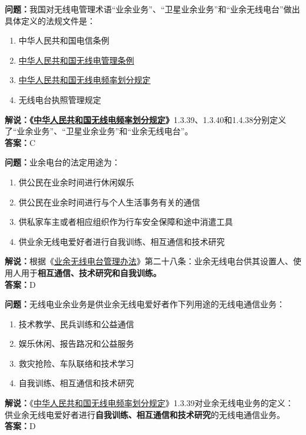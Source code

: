 \textbf{问题：}我国对无线电管理术语“业余业务”、“卫星业余业务”和“业余无线电台”做出具体定义的法规文件是：
\begin{enumerate}[label=\Alph*), leftmargin=1cm]
	\item 中华人民共和国电信条例
	\item \href{http://www.gov.cn/zhengce/content/2016-11/25/content_5137687.htm}{中华人民共和国无线电管理条例}
	\item \href{https://www.miit.gov.cn/zwgk/zcwj/wjfb/txy/art/2020/art_066386284cd2449493586c81ccafed11.html}{中华人民共和国无线电频率划分规定}
	\item 无线电台执照管理规定
\end{enumerate}
\textbf{解说：《\href{https://www.miit.gov.cn/zwgk/zcwj/wjfb/txy/art/2020/art_066386284cd2449493586c81ccafed11.html}{中华人民共和国无线电频率划分规定}》}1.3.39、1.3.40和1.4.38分别定义了“业余业务”、“卫星业余业务”和“业余无线电台”。\\\textbf{答案：}C


\textbf{问题：}业余电台的法定用途为：
\begin{enumerate}[label=\Alph*), leftmargin=1cm]
	\item 供公民在业余时间进行休闲娱乐
	\item 供公民在业余时间进行与个人生活事务有关的通信
	\item 供私家车主或者相应组织作为行车安全保障和途中消遣工具
	\item 供业余无线电爱好者进行自我训练、相互通信和技术研究
\end{enumerate}
\textbf{解说：}根据《\href{https://www.miit.gov.cn/jgsj/zfs/bmgz/art/2020/art_147b69815b3641caad9047735f94c860.html}{业余无线电台管理办法}》第二十八条：业余无线电台供其设置人、使用人用于\textbf{相互通信、技术研究和自我训练。}\\\textbf{答案：}D


\textbf{问题：}无线电业余业务是供业余无线电爱好者作下列用途的无线电通信业务：
\begin{enumerate}[label=\Alph*), leftmargin=1cm]
	\item 技术教学、民兵训练和公益通信
	\item 娱乐休闲、报告路况和公益服务
	\item 救灾抢险、车队联络和技术学习
	\item 自我训练、相互通信和技术研究
\end{enumerate}
\textbf{解说：}《\href{https://www.miit.gov.cn/zwgk/zcwj/wjfb/txy/art/2020/art_066386284cd2449493586c81ccafed11.html}{中华人民共和国无线电频率划分规定}》1.3.39对业余无线电业务的定义：供业余无线电爱好者进行\textbf{自我训练、相互通信和技术研究}的无线电通信业务。\\\textbf{答案：}D


